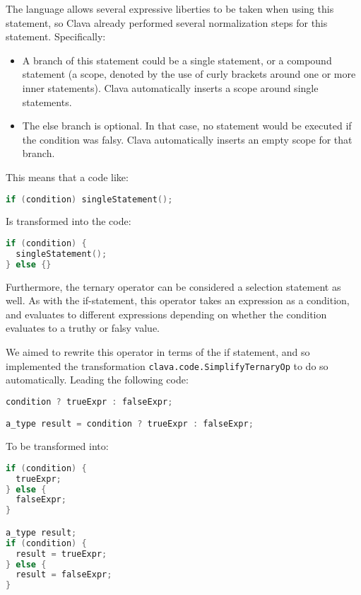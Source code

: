 The language allows several expressive liberties to be taken when using this statement, so Clava already performed several normalization steps for this statement. Specifically:

\begin{itemize}
    \item A branch of this statement could be a single statement, or a compound statement (a scope, denoted by the use of curly brackets around one or more inner statements). Clava automatically inserts a scope around single statements.
    \item The else branch is optional. In that case, no statement would be executed if the condition was falsy. Clava automatically inserts an empty scope for that branch.
\end{itemize}

This means that a code like:

\begin{lstlisting}[language=C]
if (condition) singleStatement();
\end{lstlisting}

Is transformed into the code:

\begin{lstlisting}[language=C]
if (condition) {
  singleStatement();
} else {}
\end{lstlisting}

Furthermore, the ternary operator can be considered a selection statement as well. As with the if-statement, this operator takes an expression as a condition, and evaluates to different expressions depending on whether the condition evaluates to a truthy or falsy value.

We aimed to rewrite this operator in terms of the if statement, and so implemented the transformation \verb|clava.code.SimplifyTernaryOp| to do so automatically. Leading the following code:

\begin{lstlisting}[language=C]
condition ? trueExpr : falseExpr;

a_type result = condition ? trueExpr : falseExpr;
\end{lstlisting}

To be transformed into:

\begin{lstlisting}[language=C]
if (condition) {
  trueExpr;
} else {
  falseExpr;
}

a_type result;
if (condition) {
  result = trueExpr;
} else {
  result = falseExpr;
}
\end{lstlisting}

